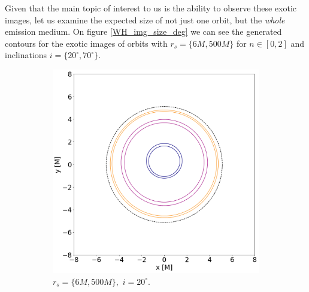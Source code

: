 \documentclass[12pt]{article}
\numberwithin{equation}{section}
\numberwithin{figure}{section}
\begin{document}
	Given that the main topic of interest to us is the ability to observe these exotic images, let us examine the expected size of not just one orbit, but the \emph{whole} emission medium. On figure \ref{WH_img_size_deg} we can see the generated contours for the exotic images of orbits with $r_s = \{6M, 500M\}$ for $n\in[0,2]$ and inclinations $i = \{20^\circ,70^\circ\}$.\\
	
	\begin{figure}[!htb]
		\centering
		\begin{subfigure}{6cm}
			\hspace{-0.8cm}
			\includegraphics[scale = 0.25]{Section_6_Morphology_of_the images_of_horizonless_spacetimes/WH_20_deg_r6_r500.png}
			\caption{$r_s = \{6M, 500M\},\,\, i = 20^\circ$.}
		\end{subfigure}\,\,\,
		\begin{subfigure}{6cm}
			\hspace{-0.3cm}

\end{subfigure}
\end{figure}
\end{document}
